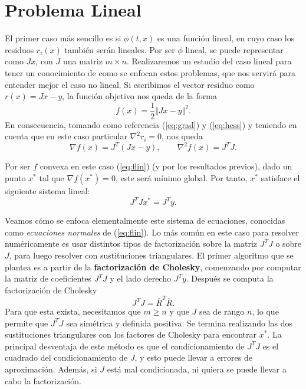 \documentclass[11pt,a4paper]{book}
\theoremstyle{definition}
\theoremstyle{remark}
\begin{document}
\section{Problema Lineal}

El primer caso más sencillo es si $\phi (t, x)$ es una función lineal, en cuyo caso los residuos
$r_i(x)$ también serán lineales.
Por ser $\phi$ lineal, se puede representar como $Jx$, con $J$ una matriz
$m\times n$.
Realizaremos un estudio del caso lineal para tener un conocimiento de como se enfocan estos problemas, que nos servirá para entender mejor el caso no lineal.
Si escribimos el vector residuo como $r(x) = Jx-y$, la función objetivo nos queda de la forma
\begin{equation}
	f(x) = \frac{1}{2} \Vert Jx-y \Vert^2.
	\label{eq:flin}
\end{equation}
En consecuencia, tomando como referencia (\ref{eq:grad}) y (\ref{eq:hess}) y teniendo en cuenta que en este caso particular $\nabla^2r_i=0$, nos queda
\begin{equation}
	\nabla f(x) = J^T(Jx-y), \qquad \nabla^2 f(x) =  J^TJ.
\end{equation}

Por ser $f$ convexa en este caso (\ref{eq:flin}) (y por los resultados previos), dado un punto $x^*$ tal que $\nabla f(x^*) = 0$, este será mínimo global. Por tanto, $x^*$ satisface el siguiente sistema lineal:
\begin{equation}
	J^TJx^* = J^Ty.
\end{equation}

Veamos cómo se enfoca elementalmente este sistema de ecuaciones, conocidas como \textit{ecuaciones normales} de (\ref{eq:flin}).
Lo más común en este caso para resolver numéricamente es usar distintos tipos de factorización sobre la matriz $J^TJ$ o sobre $J$, para luego resolver con sustituciones triangulares.
El primer algoritmo que se plantea es a partir de la \textbf{factorización de Cholesky}, comenzando por computar la matriz de coeficientes $J^TJ$ y el lado derecho $J^Ty$. Después se computa la factorización de Cholesky
\begin{equation}
	J^TJ = \bar R^T\bar R.
\end{equation}
Para que esta exista, necesitamos que $m \geq n$ y que $J$ sea de rango $n$,
lo que permite que $J^TJ$ sea simétrica y definida positiva.
Se termina realizando las dos sustituciones triangulares con los factores de Cholesky para encontrar $x^*$.
La principal desventaja de este método es que el condicionamiento de $J^TJ$ es el cuadrado del condicionamiento de $J$, y esto puede llevar a errores de aproximación.
Además, si $J$ está mal condicionada, ni quiera se puede llevar a cabo la factorización.
\end{document}
